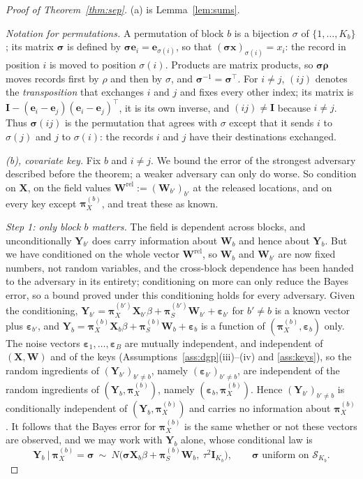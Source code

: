 \documentclass[11pt]{article}
\theoremstyle{definition}
\newcommand{\bX}{\mathbf{X}}
\newcommand{\bY}{\mathbf{Y}}
\newcommand{\bW}{\mathbf{W}}
\newcommand{\bI}{\mathbf{I}}
\newcommand{\beps}{\boldsymbol{\varepsilon}}
\newcommand{\bpi}{\boldsymbol{\pi}}
\newcommand{\bsigma}{\boldsymbol{\sigma}}
\newcommand{\calS}{\mathcal{S}}
\newcommand{\rel}{\mathrm{rel}}
\begin{document}
\begin{proof}[Proof of Theorem~\ref{thm:sep}]
(a) is Lemma~\ref{lem:sums}.

\emph{Notation for permutations.} A permutation of block $b$ is a bijection $\sigma$ of $\{1,\dots,K_b\}$; its matrix $\bsigma$ is defined by $\bsigma\bm e_i=\bm e_{\sigma(i)}$, so that $(\bsigma\bm x)_{\sigma(i)}=x_i$: the record in position $i$ is moved to position $\sigma(i)$. Products are matrix products, so $\bsigma\bm\rho$ moves records first by $\rho$ and then by $\sigma$, and $\bsigma^{-1}=\bsigma^\top$. For $i\ne j$, $(ij)$ denotes the \emph{transposition} that exchanges $i$ and $j$ and fixes every other index; its matrix is $\bI-(\bm e_i-\bm e_j)(\bm e_i-\bm e_j)^\top$, it is its own inverse, and $(ij)\ne\bI$ because $i\ne j$. Thus $\bsigma(ij)$ is the permutation that agrees with $\sigma$ except that it sends $i$ to $\sigma(j)$ and $j$ to $\sigma(i)$: the records $i$ and $j$ have their destinations exchanged.

\emph{(b), covariate key.} Fix $b$ and $i\ne j$. We bound the error of the strongest adversary described before the theorem; a weaker adversary can only do worse. So condition on $\bX$, on the field values $\bW^\rel:=(\bW_{b'})_{b'}$ at the released locations, and on every key except $\bpi_X^{(b)}$, and treat these as known.

\emph{Step 1: only block $b$ matters.} The field is dependent across blocks, and unconditionally $\bY_{b'}$ does carry information about $\bW_b$ and hence about $\bY_b$. But we have conditioned on the whole vector $\bW^\rel$, so $\bW_b$ and $\bW_{b'}$ are now fixed numbers, not random variables, and the cross-block dependence has been handed to the adversary in its entirety; conditioning on more can only reduce the Bayes error, so a bound proved under this conditioning holds for every adversary. Given the conditioning, $\bY_{b'}=\bpi_X^{(b')}\bX_{b'}\beta+\bpi_S^{(b')}\bW_{b'}+\beps_{b'}$ for $b'\ne b$ is a known vector plus $\beps_{b'}$, and $\bY_b=\bpi_X^{(b)}\bX_b\beta+\bpi_S^{(b)}\bW_b+\beps_b$ is a function of $(\bpi_X^{(b)},\beps_b)$ only. The noise vectors $\beps_1,\dots,\beps_B$ are mutually independent, and independent of $(\bX,\bW)$ and of the keys (Assumptions~\ref{ass:dgp}(iii)--(iv) and \ref{ass:keys}), so the random ingredients of $(\bY_{b'})_{b'\ne b}$, namely $(\beps_{b'})_{b'\ne b}$, are independent of the random ingredients of $(\bY_b,\bpi_X^{(b)})$, namely $(\beps_b,\bpi_X^{(b)})$. Hence $(\bY_{b'})_{b'\ne b}$ is conditionally independent of $(\bY_b,\bpi_X^{(b)})$ and carries no information about $\bpi_X^{(b)}$. It follows that the Bayes error for $\bpi_X^{(b)}$ is the same whether or not these vectors are observed, and we may work with $\bY_b$ alone, whose conditional law is
\[
\bY_b\ \big|\ \bpi_X^{(b)}=\bsigma\ \sim\ N\big(\bsigma\bX_b\beta+\bpi_S^{(b)}\bW_b,\ \tau^2\bI_{K_b}\big),\qquad\bsigma\text{ uniform on }\calS_{K_b}.
\]


\end{proof}
\end{document}
